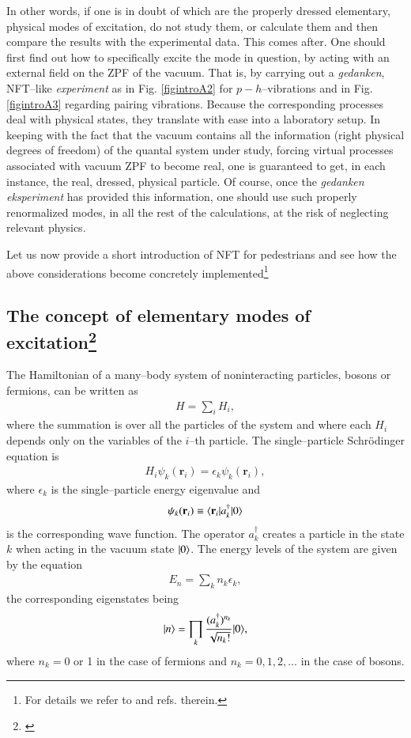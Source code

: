 In other words, if one is in doubt of which are the properly dressed elementary, physical modes of excitation, do not study them, or calculate them and then compare the results with the experimental data. This comes after. One should first find out how to specifically excite the  mode in question, by acting with an external field on the ZPF of the vacuum. That is, by carrying out a \textit{gedanken}, NFT--like \textit{experiment} as in Fig. \ref{figintroA2} for $p-h$--vibrations and in Fig. \ref{figintroA3} regarding pairing vibrations. Because the corresponding processes deal  with physical states, they translate with ease into a laboratory setup. In keeping with the fact that the vacuum contains all the information (right physical degrees of freedom) of the quantal system under study, forcing virtual processes associated  with vacuum ZPF to become real, one is guaranteed to get, in each instance, the real, dressed, physical particle. Of course, once the \emph{gedanken eksperiment} has provided this information, one should use such properly renormalized modes, in all the rest of the calculations, at the risk of neglecting relevant physics. 


Let us now provide a short introduction of NFT for pedestrians and see how the above considerations become concretely implemented\footnote{For details we refer to \cite{Bortignon:77} and refs. therein.}
\subsection[The concept of elementary modes of excitation]{The concept of elementary modes of excitation\protect\footnote{\cite{Bes:77}}}\label{C1S7.1}
The Hamiltonian of a many--body system of noninteracting particles, bosons or fermions, can be written as
\begin{align}\label{eqC1A1}
H=\sum_iH_i,
\end{align}
where the summation is over all the particles of the system and where each $H_i$ depends only on the variables of the $i$--th particle. The single--particle Schr\"odinger equation is
\begin{align}\label{eqC1A2}
H_i\psi_k(\mathbf r_i)=\epsilon_k \psi_k(\mathbf r_i),
\end{align}
where $\epsilon_k$ is the single--particle energy eigenvalue and 
\begin{align}\label{eqC1A3}
\psi_k(\mathbf r_i)\equiv\langle {\mathbf r_i}|a_k^\dagger|{0} \rangle
\end{align}
is the corresponding wave function. The operator $a_k^\dagger$ creates a particle in the state $k$ when acting in the vacuum state $|{0} \rangle$. The energy levels of the system are given by the equation
\begin{align}\label{eqC1A4}
E_n=\sum_k n_k\epsilon_k,
\end{align}
the corresponding eigenstates being
\begin{align}\label{eqC1A5}
|{n} \rangle=\prod_k\frac{(a_k^\dagger)^{n_k}}{\sqrt{n_k!}}|{0} \rangle,
\end{align}
where $n_k=0$ or 1 in the case of fermions and $n_k=0,1,2,\dots$ in the case of bosons.

